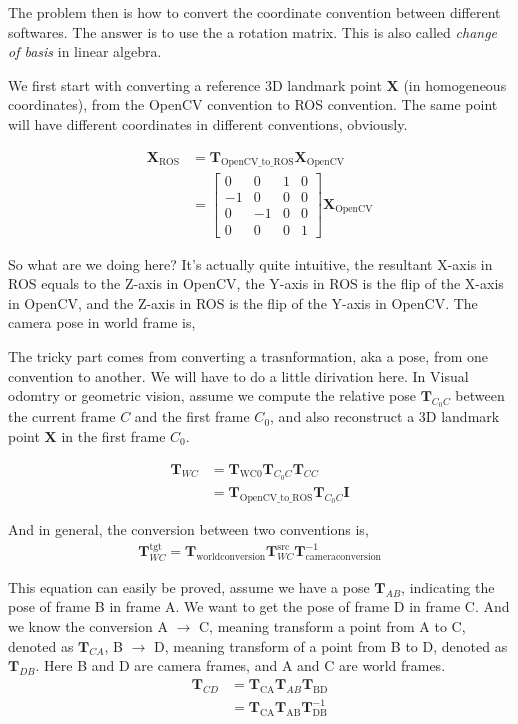\documentclass{article}
\begin{document}
The problem then is how to convert the coordinate convention between different softwares. The answer is to use the a rotation matrix. This is also called \textit{change of basis} in linear algebra.

We first start with converting a reference 3D landmark point $\mathbf{X}$ (in homogeneous coordinates), from the OpenCV convention to ROS convention. The same point will have different coordinates in different conventions, obviously.

\begin{align}
    \mathbf{X}_{\text{ROS}} & = \mathbf{T}_{\text{OpenCV\_to\_ROS}} \mathbf{X}_{\text{OpenCV}} \\
    & = 
    \begin{bmatrix}
    0 & 0 & 1 & 0 \\
    -1 & 0 & 0 & 0 \\
    0 & -1 & 0 & 0 \\
    0 & 0 & 0 & 1
    \end{bmatrix} \mathbf{X}_{\text{OpenCV}}
\end{align}

So what are we doing here? It's actually quite intuitive, the resultant X-axis in ROS equals to the Z-axis in OpenCV, the Y-axis in ROS is the flip of the X-axis in OpenCV, and the Z-axis in ROS is the flip of the Y-axis in OpenCV. The camera pose in world frame is,

The tricky part comes from converting a trasnformation, aka a pose, from one convention to another. We will have to do a little dirivation here. In Visual odomtry or geometric vision,
assume we compute the relative pose $\mathbf{T}_{C_0C}$ between the current frame $C$ and the first frame $C_0$, and also reconstruct a 3D landmark point $\mathbf{X}$ in the first frame $C_0$.

\begin{align}
    \mathbf{T}_{WC} &= \mathbf{T}_{\text{WC0}} \mathbf{T}_{C_0C} \mathbf{T}_{CC} \\
    &= \mathbf{T}_{\text{OpenCV\_to\_ROS}}\mathbf{T}_{C_0C} \mathbf{I}
\end{align}

And in general, the conversion between two conventions is,
\begin{align}
    \mathbf{T}_{WC}^{\text{tgt}} = \mathbf{T}_{\text{worldconversion}} \mathbf{T}_{WC}^{\text{src}} \mathbf{T}_{\text{cameraconversion}}^{-1}
\end{align}

This equation can easily be proved, assume we have a pose $\mathbf{T}_{AB}$, indicating the pose of frame B in frame A. We want to get the pose of frame D in frame C. And we know the conversion A $\rightarrow$ C, meaning transform a point from A to C, denoted as $\mathbf{T}_{CA}$, B $\rightarrow$ D, meaning transform of a point from B to D, denoted as $\mathbf{T}_{DB}$. Here B and D are camera frames, and A and C are world frames.
\begin{align}
    \mathbf{T}_{CD} &= \mathbf{T}_{\text{CA}} \mathbf{T}_{AB} \mathbf{T}_{\text{BD}} \\
    &= \mathbf{T}_{\text{CA}} \mathbf{T}_{\text{AB}} \mathbf{T}_{\text{DB}}^{-1}
\end{align}
\end{document}
